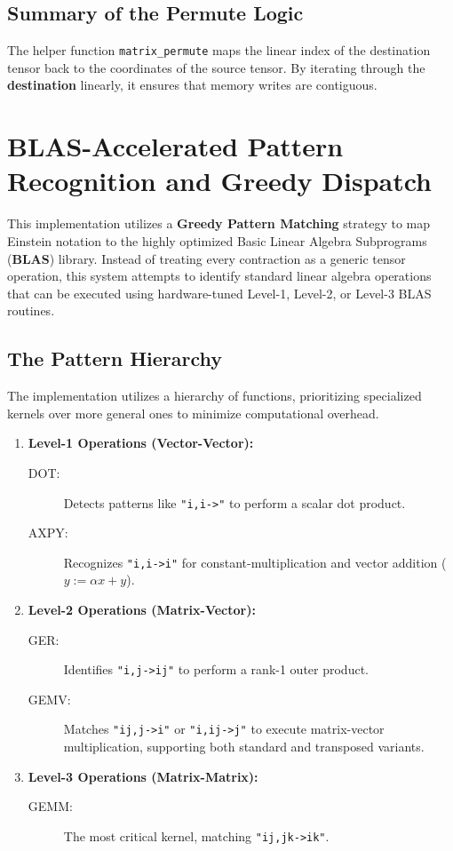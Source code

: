 \documentclass[binding=0.6cm]{sapthesis}
\begin{document}
\subsection{Summary of the Permute Logic}
The helper function \texttt{matrix\_permute} maps the linear index of the destination tensor back to the coordinates of the source tensor. By iterating through the \textbf{destination} linearly, it ensures that memory writes are contiguous.

\section{BLAS-Accelerated Pattern Recognition and Greedy Dispatch}

This implementation utilizes a \textbf{Greedy Pattern Matching} strategy to map Einstein notation to the highly optimized Basic Linear Algebra Subprograms (\textbf{BLAS}) library. Instead of treating every contraction as a generic tensor operation, this system attempts to identify standard linear algebra operations that can be executed using hardware-tuned Level-1, Level-2, or Level-3 BLAS routines.

\subsection{The Pattern Hierarchy}

The implementation utilizes a hierarchy of functions, prioritizing specialized kernels over more general ones to minimize computational overhead.

\begin{enumerate}
	\item \textbf{Level-1 Operations (Vector-Vector):}
	      \begin{description}
		      \item [DOT:] Detects patterns like \texttt{"i,i->"} to perform a scalar dot product.
		      \item [AXPY:] Recognizes \texttt{"i,i->i"} for constant-multiplication and vector addition ($y := \alpha x + y$).
	      \end{description}

	\item \textbf{Level-2 Operations (Matrix-Vector):}
	      \begin{description}
		      \item [GER:] Identifies \texttt{"i,j->ij"} to perform a rank-1 outer product.
		      \item [GEMV:] Matches \texttt{"ij,j->i"} or \texttt{"i,ij->j"} to execute matrix-vector multiplication, supporting both standard and transposed variants.
	      \end{description}

	\item \textbf{Level-3 Operations (Matrix-Matrix):}
	      \begin{description}
		      \item [GEMM:] The most critical kernel, matching \texttt{"ij,jk->ik"}.
	      \end{description}
\end{enumerate}
\end{document}

